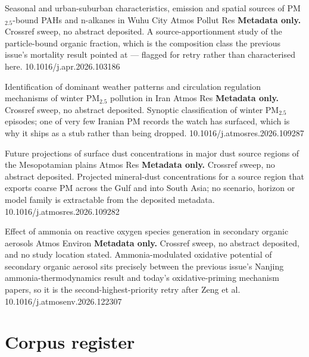 \documentclass[10pt]{article}
\begin{document}
{Seasonal and urban-suburban characteristics, emission and spatial sources of PM$_{2.5}$-bound PAHs and n-alkanes in Wuhu City}
{Atmos Pollut Res}
{\textbf{Metadata only.} Crossref sweep, no abstract deposited. A source-apportionment
study of the particle-bound organic fraction, which is the composition class the previous
issue's mortality result pointed at --- flagged for retry rather than characterised here.}
{10.1016/j.apr.2026.103186}

{Identification of dominant weather patterns and circulation regulation mechanisms of winter PM$_{2.5}$ pollution in Iran}
{Atmos Res}
{\textbf{Metadata only.} Crossref sweep, no abstract deposited. Synoptic classification
of winter PM$_{2.5}$ episodes; one of very few Iranian PM records the watch has surfaced,
which is why it ships as a stub rather than being dropped.}
{10.1016/j.atmosres.2026.109287}

{Future projections of surface dust concentrations in major dust source regions of the Mesopotamian plains}
{Atmos Res}
{\textbf{Metadata only.} Crossref sweep, no abstract deposited. Projected mineral-dust
concentrations for a source region that exports coarse PM across the Gulf and into South
Asia; no scenario, horizon or model family is extractable from the deposited metadata.}
{10.1016/j.atmosres.2026.109282}

{Effect of ammonia on reactive oxygen species generation in secondary organic aerosols}
{Atmos Environ}
{\textbf{Metadata only.} Crossref sweep, no abstract deposited, and no study location
stated. Ammonia-modulated oxidative potential of secondary organic aerosol sits precisely
between the previous issue's Nanjing ammonia-thermodynamics result and today's
oxidative-priming mechanism papers, so it is the second-highest-priority retry after
Zeng et al.}
{10.1016/j.atmosenv.2026.122307}

\vspace{4mm}
\section*{\sffamily\bfseries\color{Deep}Corpus register}
\vspace{-1.5mm}{\color{Amber}\rule{\linewidth}{1.1pt}}\vspace{2.5mm}


\end{document}
